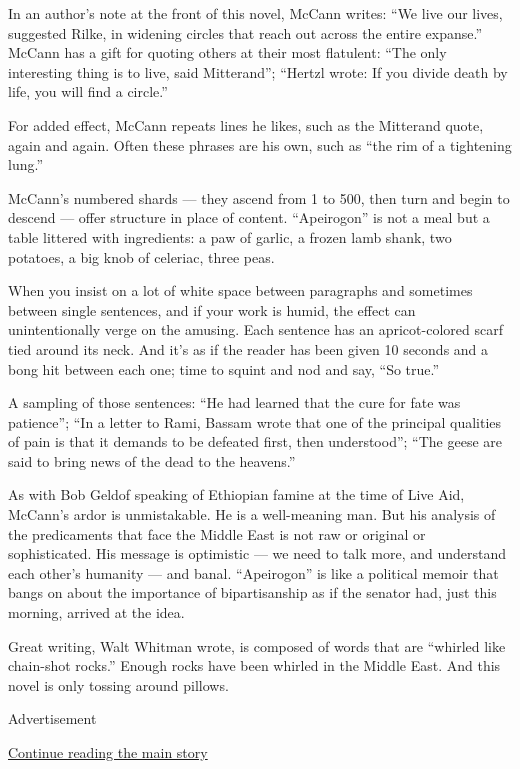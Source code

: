 In an author's note at the front of this novel, McCann writes: ``We live
our lives, suggested Rilke, in widening circles that reach out across
the entire expanse.'' McCann has a gift for quoting others at their most
flatulent: ``The only interesting thing is to live, said Mitterand'';
``Hertzl wrote: If you divide death by life, you will find a circle.''

For added effect, McCann repeats lines he likes, such as the Mitterand
quote, again and again. Often these phrases are his own, such as ``the
rim of a tightening lung.''

McCann's numbered shards --- they ascend from 1 to 500, then turn and
begin to descend --- offer structure in place of content. ``Apeirogon''
is not a meal but a table littered with ingredients: a paw of garlic, a
frozen lamb shank, two potatoes, a big knob of celeriac, three peas.

When you insist on a lot of white space between paragraphs and sometimes
between single sentences, and if your work is humid, the effect can
unintentionally verge on the amusing. Each sentence has an
apricot-colored scarf tied around its neck. And it's as if the reader
has been given 10 seconds and a bong hit between each one; time to
squint and nod and say, ``So true.''

A sampling of those sentences: ``He had learned that the cure for fate
was patience''; ``In a letter to Rami, Bassam wrote that one of the
principal qualities of pain is that it demands to be defeated first,
then understood''; ``The geese are said to bring news of the dead to the
heavens.''

As with Bob Geldof speaking of Ethiopian famine at the time of Live Aid,
McCann's ardor is unmistakable. He is a well-meaning man. But his
analysis of the predicaments that face the Middle East is not raw or
original or sophisticated. His message is optimistic --- we need to talk
more, and understand each other's humanity --- and banal. ``Apeirogon''
is like a political memoir that bangs on about the importance of
bipartisanship as if the senator had, just this morning, arrived at the
idea.

Great writing, Walt Whitman wrote, is composed of words that are
``whirled like chain-shot rocks.'' Enough rocks have been whirled in the
Middle East. And this novel is only tossing around pillows.

Advertisement

\protect\hyperlink{after-bottom}{Continue reading the main story}

